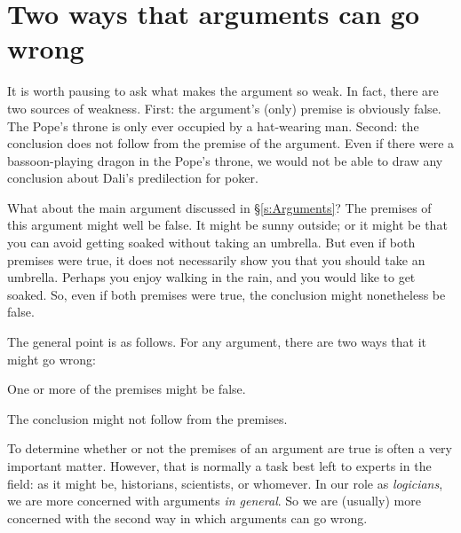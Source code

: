 \section{Two ways that arguments can go wrong}

It is worth pausing to ask what makes the argument so weak. In fact, there are two sources of weakness. First: the argument's (only) premise is obviously false. The Pope's throne is only ever occupied by a hat-wearing man. Second: the conclusion does not follow from the premise of the argument. Even if there were a bassoon-playing dragon in the Pope's throne, we would not be able to draw any conclusion about Dali's predilection for poker.

What about the main argument discussed in \S\ref{s:Arguments}? The premises of this argument might well be false. It might be sunny outside; or it might be that you can avoid getting soaked without taking an umbrella. But even if both premises were true, it does not necessarily show you that you should take an umbrella. Perhaps you enjoy walking in the rain, and you would like to get soaked. So, even if both premises were true, the conclusion might nonetheless be false.

%

The general point is as follows. For any argument, there are two ways that it might go wrong:
	\begin{ebullet}
		\item One or more of the premises might be false. 
		\item The conclusion might not follow from the premises.
	\end{ebullet}
To determine whether or not the premises of an argument are true is often a very important matter. However, that is normally a task best left to experts in the field: as it might be, historians, scientists, or whomever. In our role as \emph{logicians}, we are more concerned with arguments \emph{in general}. So we are (usually) more concerned with the second way in which arguments can go wrong.

